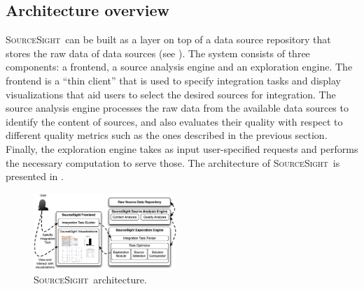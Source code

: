 \documentclass{vldb}
\newcommand\system{\textsc{SourceSight}}
\begin{document}
\subsection{Architecture overview}
\system~can be built as a layer on top of a data source repository that stores the raw data of data sources (see ). The system consists of three components: a frontend, a source analysis engine and an exploration engine. The frontend is a ``thin client'' that is used to specify integration tasks and display visualizations that aid users to select the desired sources for integration. The source analysis engine processes the raw data from the available data sources to identify the content of sources, and also evaluates their quality with respect to different quality metrics such as the ones described in the previous section. Finally, the exploration engine takes as input user-specified requests and performs the necessary computation to serve those. The architecture of \system~is presented in . 

\begin{figure}[h]
    \centering
    \includegraphics[width=0.48\textwidth]{fig/srcsightOver}
    \caption{\system~architecture.}
    \label{fig:architecture}
\end{figure}
\end{document}
